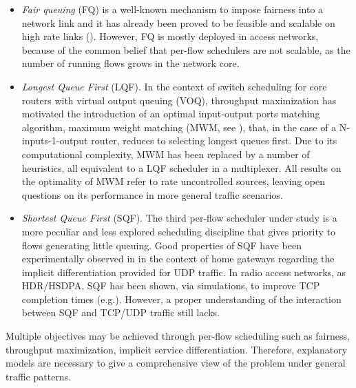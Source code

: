 \documentclass[a4paper,oneside, 11pt]{article}
\begin{document}
\begin{itemize}
\item
\textit{Fair queuing} (FQ) is a well-known mechanism to impose fairness into a network link and it has
already been proved to be feasible and scalable on high rate links (\hspace{-0.1mm}\cite{suter, korte04, korte05}).
However, FQ is mostly deployed in access networks, because
of the common belief that per-flow schedulers are not scalable, as the number of running flows
grows in the network core.
\item
\textit{Longest Queue First} (LQF).
In the context of switch scheduling for core routers with virtual output queuing (VOQ),
throughput maximization has motivated the introduction of
an optimal input-output ports matching algorithm, maximum weight matching (MWM, see \cite{nick}),
that, in the case of a N-inputs-1-output router, reduces to selecting longest queues first.
Due to its computational complexity, MWM has been replaced by a number of heuristics, all equivalent
to a LQF scheduler in a multiplexer.
All results on the optimality of MWM refer to rate uncontrolled sources,
leaving open questions on its performance in more general traffic scenarios.

\item
\textit{Shortest Queue First} (SQF).
The third per-flow scheduler under study is a more peculiar and less explored scheduling discipline
that gives priority to flows generating little queuing.
Good properties of SQF  have been experimentally observed in \cite{ostallo,sqf-demo} in the context of home gateways
regarding the implicit differentiation provided for UDP traffic.
In radio access networks, as HDR/HSDPA, SQF has been shown, via simulations, to improve TCP completion times (e.g.\cite{umts}).
However, a proper understanding of the interaction between SQF and TCP/UDP traffic still lacks.

\end{itemize}

Multiple objectives may be achieved through per-flow scheduling such as fairness,
throughput maximization, implicit service differentiation. Therefore, explanatory models are necessary
to give a comprehensive view of the problem under general traffic patterns.
\end{document}
